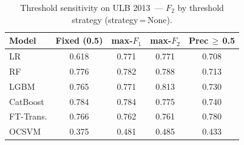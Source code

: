 \begin{table}[ht!]
\centering
\caption{Threshold sensitivity on ULB 2013~--- $F_2$ by threshold strategy (strategy\,=\,None).}
\label{tab:threshold_ulb_f2}
\begin{tabular}{l c c c c}
\toprule
Model & Fixed (0.5) & max-$F_1$ & max-$F_2$ & Prec\,$\geq$\,0.5 \\
\midrule
LR         & 0.618 & 0.771 & 0.771 & 0.708 \\
RF         & 0.776 & 0.782 & 0.788 & 0.713 \\
LGBM       & 0.765 & 0.771 & 0.813 & 0.730 \\
CatBoost   & 0.784 & 0.784 & 0.775 & 0.740 \\
FT-Trans.  & 0.766 & 0.762 & 0.761 & 0.780 \\
OCSVM      & 0.375 & 0.481 & 0.485 & 0.433 \\
\bottomrule
\end{tabular}
\end{table}
